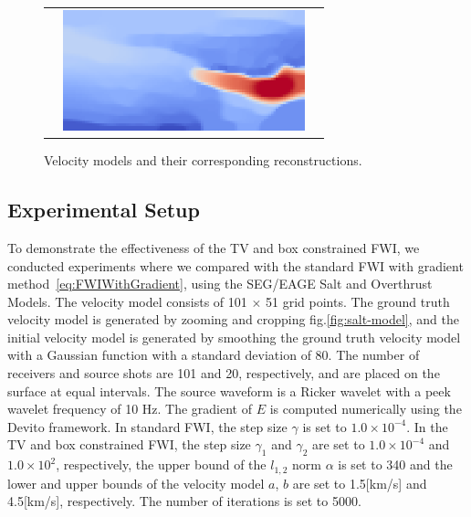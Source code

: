 \begin{figure}[htbp]
\begin{tabular}{m{68mm} m{70mm} m{10mm}}
\begin{minipage}[b]{70mm}
            \caption*{Initial model}
        \end{minipage} &
        \begin{minipage}[b]{70mm}
            \centering
            \includegraphics[width=70mm]{public/pds}
            \caption*{Reconstructed with the constrained FWI}
        \end{minipage} &
    \end{tabular}
    \caption{Velocity models and their corresponding reconstructions.}
    \label{fig:velocity-models}
\end{figure}


\subsection{Experimental Setup}\label{subsec:experimental-setup}

%
%
%
To demonstrate the effectiveness of the TV and box constrained FWI, we conducted experiments where we compared with the standard FWI with gradient method~\eqref{eq:FWIWithGradient}, using the SEG/EAGE Salt and Overthrust Models.
The velocity model consists of 101 $\times$ 51 grid points.
The ground truth velocity model is generated by zooming and cropping fig.\ref{fig:salt-model}, and the initial velocity model is generated by smoothing the ground truth velocity model with a Gaussian function with a standard deviation of 80.
The number of receivers and source shots are 101 and 20, respectively, and are placed on the surface at equal intervals.
The source waveform is a Ricker wavelet with a peek wavelet frequency of 10 Hz.
The gradient of $E$ is computed numerically using the Devito framework\cite{devito}.
In standard FWI, the step size $\gamma$ is set to $1.0 \times 10^{-4}$.
In the TV and box constrained FWI, the step size $\gamma_1$ and $\gamma_2$ are set to $1.0 \times 10^{-4}$ and $1.0 \times 10^2$, respectively, the upper bound of the $l_{1,2}$ norm $\alpha$ is set to 340 and the lower and upper bounds of the velocity model $a$, $b$ are set to 1.5[km/s] and 4.5[km/s], respectively.
The number of iterations is set to 5000.


